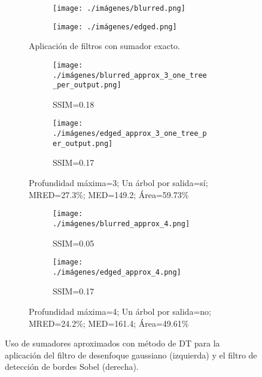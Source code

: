 \begin{figure}
  \centering
  \begin{subfigure}{0.7\textwidth}
    \centering
    \begin{subfigure}{0.45\textwidth}
      \texttt{[image: ./imágenes/blurred.png]}
    \end{subfigure}
    \hfill
    \begin{subfigure}{0.45\textwidth}
      \texttt{[image: ./imágenes/edged.png]}
    \end{subfigure}
    \caption{Aplicación de filtros con sumador exacto.}
  \end{subfigure}
  \begin{subfigure}{0.7\textwidth}
    \centering
    \begin{subfigure}{0.45\textwidth}
      \texttt{[image: ./imágenes/blurred\_approx\_3\_one\_tree\_per\_output.png]}
      \caption*{SSIM=0.18}
    \end{subfigure}
    \hfill
    \begin{subfigure}{0.45\textwidth}
      \texttt{[image: ./imágenes/edged\_approx\_3\_one\_tree\_per\_output.png]}
      \caption*{SSIM=0.17}
    \end{subfigure}
    \centering
    \caption{Profundidad máxima=3; Un árbol por salida=sí; MRED=27.3\%; MED=149.2; Área=59.73\%}
  \end{subfigure}

  \begin{subfigure}{0.7\textwidth}
    \centering
    \begin{subfigure}{0.45\textwidth}
      \texttt{[image: ./imágenes/blurred\_approx\_4.png]}
      \caption*{SSIM=0.05}
    \end{subfigure}
    \hfill
    \begin{subfigure}{0.45\textwidth}
      \texttt{[image: ./imágenes/edged\_approx\_4.png]}
      \caption*{SSIM=0.17}
    \end{subfigure}
    \centering
    \caption{Profundidad máxima=4; Un árbol por salida=no; MRED=24.2\%; MED=161.4; Área=49.61\%}
  \end{subfigure}

  \caption{Uso de sumadores aproximados con método de DT para la aplicación del filtro de desenfoque gaussiano (izquierda) y el filtro de detección de bordes Sobel (derecha).}
\label{fig:filters}
\end{figure}

